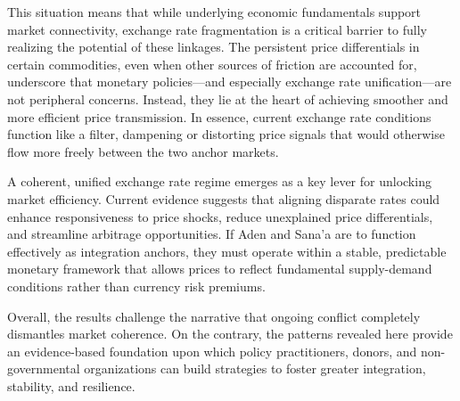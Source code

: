 This situation means that while underlying economic fundamentals support market connectivity, exchange rate fragmentation is a critical barrier to fully realizing the potential of these linkages. The persistent price differentials in certain commodities, even when other sources of friction are accounted for, underscore that monetary policies—and especially exchange rate unification—are not peripheral concerns. Instead, they lie at the heart of achieving smoother and more efficient price transmission. In essence, current exchange rate conditions function like a filter, dampening or distorting price signals that would otherwise flow more freely between the two anchor markets.

A coherent, unified exchange rate regime emerges as a key lever for unlocking market efficiency. Current evidence suggests that aligning disparate rates could enhance responsiveness to price shocks, reduce unexplained price differentials, and streamline arbitrage opportunities. If Aden and Sana'a are to function effectively as integration anchors, they must operate within a stable, predictable monetary framework that allows prices to reflect fundamental supply-demand conditions rather than currency risk premiums.

Overall, the results challenge the narrative that ongoing conflict completely dismantles market coherence. On the contrary, the patterns revealed here provide an evidence-based foundation upon which policy practitioners, donors, and non-governmental organizations can build strategies to foster greater integration, stability, and resilience.
